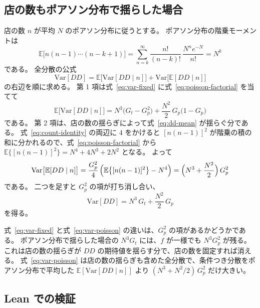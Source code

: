 \documentclass[a4paper,11pt]{ltjsarticle}
\begin{document}
\subsection{店の数もポアソン分布で揺らした場合}

店の数 $n$ が平均 $N$ のポアソン分布に従うとする。
ポアソン分布の階乗モーメントは
\begin{equation}
  \mathbb{E}\bigl[n(n-1)\cdots(n-k+1)\bigr]
  = \sum_{n=k}^{\infty} \frac{n!}{(n-k)!}\, \frac{N^n e^{-N}}{n!}
  = N^k
  \label{eq:poisson-factorial}
\end{equation}
である。
全分散の公式
\begin{equation}
  \mathrm{Var}[DD] = \mathbb{E}\bigl[\mathrm{Var}[DD \mid n]\bigr] + \mathrm{Var}\bigl[\mathbb{E}[DD \mid n]\bigr]
  \label{eq:total-var}
\end{equation}
の右辺を順に求める。
第 1 項は式~\eqref{eq:var-fixed} に式~\eqref{eq:poisson-factorial} を当てて
\begin{equation}
  \mathbb{E}\bigl[\mathrm{Var}[DD \mid n]\bigr] = N^3 \bigl(G_t - G_p^2\bigr) + \frac{N^2}{2}\, G_p\bigl(1 - G_p\bigr)
\end{equation}
である。
第 2 項は、店の数の揺らぎによって式~\eqref{eq:dd-mean} が揺らぐ分である。
式~\eqref{eq:count-identity} の両辺に $4$ をかけると $[n(n-1)]^2$ が階乗の積の和に分かれるので、式~\eqref{eq:poisson-factorial} から $\mathbb{E}\{[n(n-1)]^2\} = N^4 + 4N^3 + 2N^2$ となる。
よって
\begin{equation}
  \mathrm{Var}\bigl[\mathbb{E}[DD \mid n]\bigr]
  = \frac{G_p^2}{4}\, \Bigl(\mathbb{E}\bigl\{[n(n-1)]^2\bigr\} - N^4\Bigr)
  = \Bigl(N^3 + \frac{N^2}{2}\Bigr)\, G_p^2
\end{equation}
である。
二つを足すと $G_p^2$ の項が打ち消し合い、
\begin{equation}
  \mathrm{Var}[DD] = N^3\, G_t + \frac{N^2}{2}\, G_p
  \label{eq:var-poisson}
\end{equation}
を得る。

式~\eqref{eq:var-fixed} と式~\eqref{eq:var-poisson} の違いは、$G_p^2$ の項があるかどうかである。
ポアソン分布で揺らした場合の $N^3 G_t$ には、$f$ が一様でも $N^3 G_p^2$ が残る。
これは店の数の揺らぎが $DD$ の期待値を揺らす分で、店の数を固定すれば消える。
式~\eqref{eq:var-poisson} は店の数の揺らぎも含めた全分散で、条件つき分散をポアソン分布で平均した $\mathbb{E}[\mathrm{Var}[DD \mid n]]$ より $(N^3 + N^2/2)\, G_p^2$ だけ大きい。

\subsection{Lean での検証}
\label{app:var-dd-lean}
\end{document}
